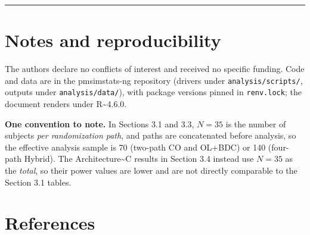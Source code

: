 \documentclass[
  11pt,
]{article}
\begin{document}
\bigskip\noindent

\rule{\textwidth}{0.4pt}\bigskip

\section{Notes and reproducibility}

The authors declare no conflicts of interest and received no specific
funding. Code and data are in the pmsimstats-ng repository (drivers
under \texttt{analysis/scripts/}, outputs under
\texttt{analysis/data/}), with package versions pinned in
\texttt{renv.lock}; the document renders under R\textasciitilde4.6.0.

\textbf{One convention to note.} In Sections 3.1 and 3.3, \(N = 35\) is
the number of subjects \emph{per randomization path}, and paths are
concatenated before analysis, so the effective analysis sample is 70
(two-path CO and OL+BDC) or 140 (four-path Hybrid). The
Architecture\textasciitilde C results in Section 3.4 instead use
\(N = 35\) as the \emph{total}, so their power values are lower and are
not directly comparable to the Section 3.1 tables.

\section{References}\label{references}
\end{document}
